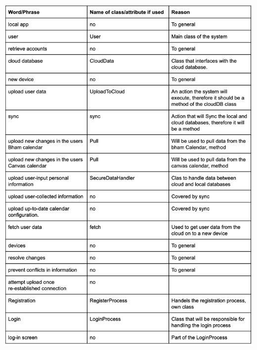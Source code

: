\documentclass[a4paper,11pt]{article} %
\begin{document}
\newpage
\begin{center}
    \includegraphics[scale=0.9]{img/noun-verb/table1.png}

\end{center}
\end{document}
